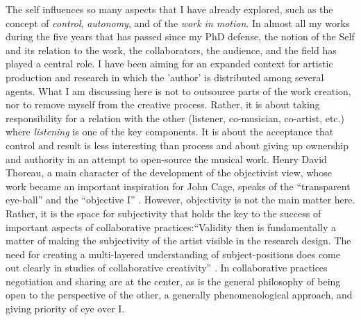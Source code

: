 \documentclass[a4paper]{article}
\begin{document}
The self influences so many aspects that I have already explored, such as the concept of \emph{control}, \emph{autonomy}, and of the \emph{work in motion}. In almost all my works during the five years that has passed since my PhD defense, the notion of the Self and its relation to the work, the collaborators, the audience, and the field has played a central role. I have been aiming for an expanded context for artistic production and research in which the 'author' is distributed among several agents.
What I am discussing here is not to outsource parts of the work creation, nor to remove myself from the creative process. Rather, it is about taking responsibility for a relation with the other (listener, co-musician, co-artist, etc.) where \emph{listening} is one of the key components. It is about the acceptance that control and result is less interesting than process and about giving up ownership and authority in an attempt to open-source the musical work. Henry David Thoreau, a main character of the development of the objectivist view, whose work became an important inspiration for John Cage, speaks of the ``transparent eye-ball'' and the ``objective I'' \citep{thoreau2004}. However, objectivity is not the main matter here. Rather, it is the space for subjectivity that holds the key to the success of important aspects of collaborative practices:``Validity then is fundamentally a matter of making the subjectivity of the artist visible in the research design. The need for creating a multi-layered understanding of subject-positions does come out clearly in studies of collaborative creativity'' \citep{frisk-ost13}. In collaborative practices negotiation and sharing are at the center, as is the general philosophy of being open to the perspective of the other, a generally phenomenological approach, and giving priority of eye over I. 
\end{document}
